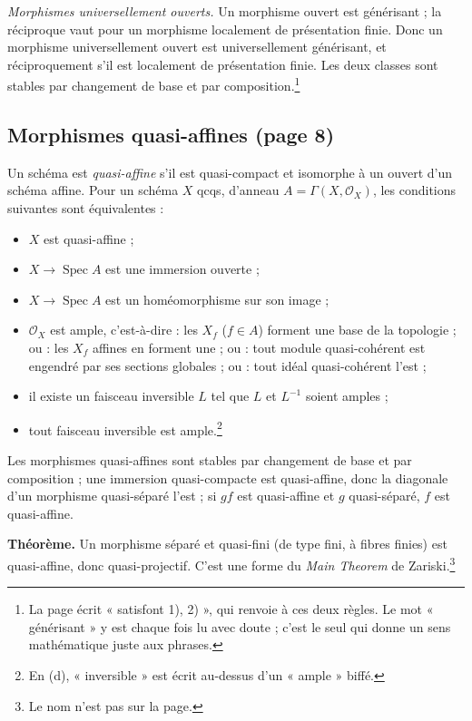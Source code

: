 \documentclass[11pt,a4paper]{article}
\begin{document}
\emph{Morphismes universellement ouverts.} Un morphisme ouvert est
générisant ; la réciproque vaut pour un morphisme localement de présentation
finie. Donc un morphisme universellement ouvert est universellement
générisant, et réciproquement s'il est localement de présentation finie. Les
deux classes sont stables par changement de base et par
composition.\footnote{La page écrit « satisfont 1), 2) », qui renvoie à ces
deux règles. Le mot « générisant » y est chaque fois lu avec doute ; c'est le
seul qui donne un sens mathématique juste aux phrases.}

\subsection*{Morphismes quasi-affines (page 8)}

Un schéma est \emph{quasi-affine} s'il est quasi-compact et isomorphe à un
ouvert d'un schéma affine. Pour un schéma $X$ qcqs, d'anneau
$A = \Gamma(X, \mathcal{O}_X)$, les conditions suivantes sont équivalentes :

\begin{itemize}
  \item[(a)] $X$ est quasi-affine ;
  \item[(b)] $X \to \operatorname{Spec} A$ est une immersion ouverte ;
  \item[(b')] $X \to \operatorname{Spec} A$ est un homéomorphisme sur son
  image ;
  \item[(c)] $\mathcal{O}_X$ est ample, c'est-à-dire : les $X_f$
  ($f \in A$) forment une base de la topologie ; ou : les $X_f$ affines en
  forment une ; ou : tout module quasi-cohérent est engendré par ses sections
  globales ; ou : tout idéal quasi-cohérent l'est ;
  \item[(d)] il existe un faisceau inversible $L$ tel que $L$ et $L^{-1}$
  soient amples ;
  \item[(d')] tout faisceau inversible est ample.\footnote{En (d), « inversible »
  est écrit au-dessus d'un « ample » biffé.}
\end{itemize}

Les morphismes quasi-affines sont stables par changement de base et par
composition ; une immersion quasi-compacte est quasi-affine, donc la diagonale
d'un morphisme quasi-séparé l'est ; si $gf$ est quasi-affine et $g$
quasi-séparé, $f$ est quasi-affine.

\textbf{Théorème.} Un morphisme séparé et quasi-fini (de type fini, à fibres
finies) est quasi-affine, donc quasi-projectif. C'est une forme du
\emph{Main Theorem} de Zariski.\footnote{Le nom n'est pas sur la page.}
\end{document}

